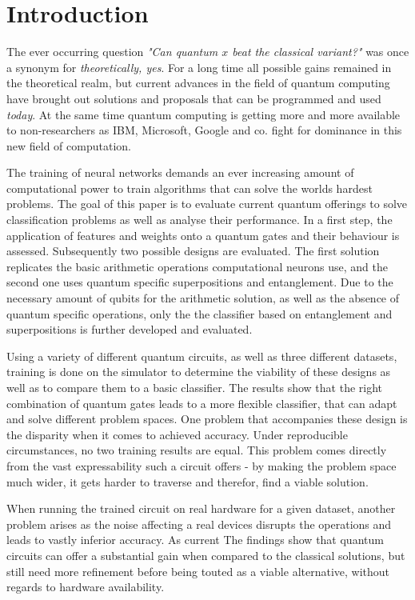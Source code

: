 
\chapter{Introduction} %

\label{chapter:introduction}

The ever occurring question \emph{"Can quantum $x$ beat the classical variant?"} was once a synonym for \emph{theoretically, yes}. For a long time all possible gains remained in the theoretical realm\cite{shor_polynomial-time_1997}, but current advances in the field of quantum computing have brought out solutions and proposals\cite{farhi_quantum_2014, fankhauser_multiple_2021, havlicek_supervised_2019} that can be programmed and used \emph{today}. At the same time quantum computing is getting more and more available to non-researchers as IBM, Microsoft, Google and co. fight for dominance in this new field of computation.\par
The training of neural networks demands an ever increasing amount of computational power\cite{openai_ai_2018} to train algorithms that can solve the worlds hardest problems. The goal of this paper is to evaluate current quantum offerings to solve classification problems as well as analyse their performance. In a first step, the application of features and weights onto a quantum gates and their behaviour is assessed. Subsequently two possible designs are evaluated. The first solution replicates the basic arithmetic operations computational neurons use, and the second one uses quantum specific superpositions and entanglement. Due to the necessary amount of qubits for the arithmetic solution, as well as the absence of quantum specific operations, only the the classifier based on entanglement and superpositions is further developed and evaluated.\par 
Using a variety of different quantum circuits, as well as three different datasets, training is done on the simulator to determine the viability of these designs as well as to compare them to a basic  classifier. The results show that the right combination of quantum gates leads to a more flexible classifier, that can adapt and solve different problem spaces. One problem that accompanies these design is the disparity when it comes to achieved accuracy. Under reproducible circumstances, no two training results are equal. This problem comes directly from the vast expressability such a circuit offers - by making the problem space much wider, it gets harder to traverse and therefor, find a viable solution.\par 
When running the trained circuit on real hardware for a given dataset, another problem arises as the noise affecting a real devices disrupts the operations and leads to vastly inferior accuracy. As current The findings show that quantum circuits can offer a substantial gain when compared to the classical solutions, but still need more refinement before being touted as a viable alternative, without regards to hardware availability. 
